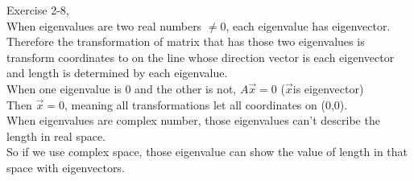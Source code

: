 \documentclass[11pt, oneside]{article}   	%
\begin{document}
Exercise 2-8,\\
When eigenvalues are two real numbers $\neq0$, each eigenvalue has eigenvector.
Therefore the transformation of matrix that has those two eigenvalues is transform coordinates to on the line whose direction vector is each eigenvector and length is determined by each eigenvalue.\\

When one eigenvalue is 0 and the other is not,
$A \vec x=0$ ($\vec x$is eigenvector)\\
Then $\vec x = 0$, meaning all transformations let all coordinates on (0,0).\\

When eigenvalues are complex number,  those eigenvalues can't describe the length in real space.\\
So if we use complex space, those eigenvalue can show the value of length in that space with eigenvectors.\\ 
\end{document}
